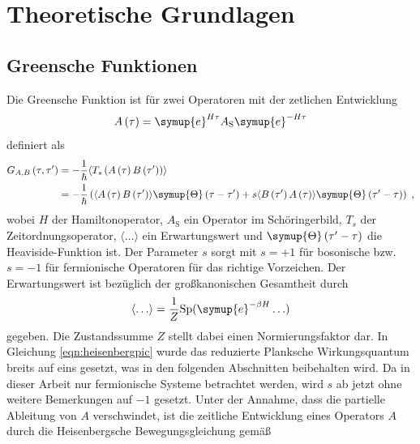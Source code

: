 \chapter{Theoretische Grundlagen}
\label{chap:theoretische_grundlagen}
\section{Greensche Funktionen}
Die Greensche Funktion ist für zwei Operatoren mit der zetlichen Entwicklung 
\begin{equation}
    A \left ( \tau \right ) = \symup{e}^{H \tau} A_\text{S} \symup{e}^{-H \tau}  \label{eqn:heisenbergpic}
\end{equation}
definiert als 
\begin{align}
    G_{A,B} \left (\tau, \tau' \right ) &= - \frac{1}{\hbar} \langle T_s \left ( A \left (\tau \right ) B \left ( \tau' \right ) \right ) \rangle \\
    & = - \frac{1}{\hbar} \left(  \langle A \left (\tau \right ) B \left ( \tau' \right ) \rangle \symup{\Theta} \left ( \tau - \tau' \right) + s 
    \langle B \left ( \tau' \right ) A \left (\tau \right ) \rangle \symup{\Theta} \left ( \tau' - \tau \right)  \right ) \; \text{,} \label{eqn:greensfunction}
\end{align}
wobei $H$ der Hamiltonoperator, $A_\text{S}$ ein Operator im Schöringerbild, $T_s$ der Zeitordnungsoperator, 
$\langle \ldots \rangle$ ein Erwartungswert und $\symup{\Theta} \left ( \tau' - \tau \right)$ die Heaviside-Funktion ist.\cite{greensfunction}
Der Parameter $s$ sorgt mit $s=+1$ für bosonische bzw. $s=-1$ für fermionische Operatoren für das richtige Vorzeichen.
Der Erwartungswert ist bezüglich der großkanonischen Gesamtheit durch 
\begin{equation*}
    \langle \ldots \rangle = \frac{1}{Z} \text{Sp}(\symup{e}^{-\beta H} \ldots)
\end{equation*}
gegeben.\cite{greensfunction}
Die Zustandssumme $Z$ stellt dabei einen Normierungsfaktor dar.
In Gleichung \eqref{eqn:heisenbergpic} wurde das reduzierte Planksche Wirkungsquantum breits auf eins gesetzt, was in den folgenden Abschnitten beibehalten wird.
Da in dieser Arbeit nur fermionische Systeme betrachtet werden, wird $s$ ab jetzt ohne weitere Bemerkungen auf $-1$ gesetzt.
Unter der Annahme, dass die partielle Ableitung von $A$ verschwindet, ist die zeitliche Entwicklung eines Operators 
$A$ durch die Heisenbergsche Bewegungsgleichung gemäß 
